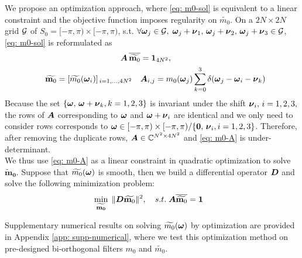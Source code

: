 We propose an optimization approach, where \eqref{eq: m0-sol} is equivalent to a linear constraint and the objective function imposes regularity on $\widetilde{m_0}$.
On a $2N\times 2N$ grid $\mathcal{G}$ of $S_0 = [-\pi, \pi)\times[-\pi, \pi)$, s.t. $\forall \boldsymbol{\omega}_j \in \mathcal{G}, \; \boldsymbol{\omega}_j+\boldsymbol{\nu}_1,\,\boldsymbol{\omega}_j+\boldsymbol{\nu}_2,\,\boldsymbol{\omega}_j+\boldsymbol{\nu}_3 \in \mathcal{G}$, \eqref{eq: m0-sol} is reformulated as
\begin{align}
\hspace*{10em} \V{A}\, \overline{\widetilde{\mathbf{m}_0}}&= \mathbf{1}_{4N^2}, \label{eq: m0-A}\\ 
\widetilde{\mathbf{m}_0} = [\widetilde{m_0}(\V{\omega}_i)]_{\,i=1,\hdots,4N^2} \quad &\V{A}_{i,j} = m_0(\V{\omega}_j)\sum_{k=0}^3\delta(\V{\omega}_j-\V{\omega}_i-\V{\nu}_k) \notag
\end{align}
Because the set $\{\boldsymbol{\omega},\, \boldsymbol{\omega}+\boldsymbol{\nu}_k,k=1,2,3\}$ is invariant under the shift $\boldsymbol{\nu}_i,\, i = 1,2,3,$ the rows of $\boldsymbol{A}$ corresponding to $\boldsymbol{\omega}$ and $\boldsymbol{\omega}+\boldsymbol{\nu}_i$ are identical and we only need to consider rows corresponds to $\boldsymbol{\omega}\in [-\pi,\pi)\times[-\pi,\pi)/\{\boldsymbol{0},\,\boldsymbol{\nu}_i,i=1,2,3\}$. Therefore, after removing the duplicate rows, $\boldsymbol{A}\in \mathbb{C}^{N^2\times 4N^2}$ and \eqref{eq: m0-A} is under-determinant. \\
We thus use \eqref{eq: m0-A} as a linear constraint in quadratic optimization to solve $\mathbf{\widetilde{m}_0}$. Suppose that $\widetilde{m_{0}}(\boldsymbol{\omega})$ is smooth, then we build a differential operator $\boldsymbol{D}$ and solve the following minimization problem:
\begin{align}
&\min_{\mathbf{\widetilde{m_{0}}}}\; \Vert \boldsymbol{D}\widetilde{\mathbf{m}_0}\Vert^2,\quad s.t. \; \boldsymbol{A}\overline{\widetilde{\mathbf{m}_0}} = \mathbf{1} \label{eq: opt-diff}
\end{align}

Supplementary numerical results on solving $\widetilde{m_{0}}(\boldsymbol{\omega})$ by optimization are provided in Appendix \ref{app: supp-numerical}, where we test this optimization method on pre-designed bi-orthogonal filters $m_0$ and $\widetilde{m_0}$.

